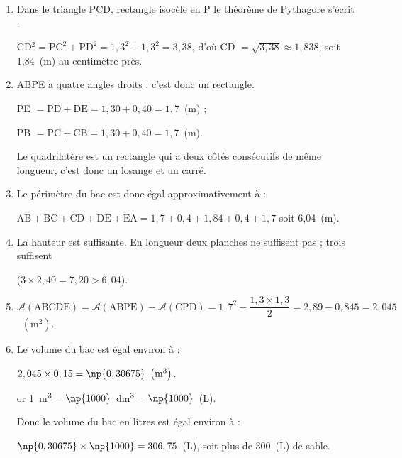 \begin{enumerate}
\item %
Dans le triangle PCD, rectangle isocèle en P le théorème de Pythagore s'écrit :

CD$^2 = \text{PC}^2 + \text{PD}^2 = 1,3^2 + 1,3^2 = 3,38$, d'où CD $= \sqrt{3,38} \approx 1,838$, soit 1,84~(m) au centimètre près.
\item %
ABPE a quatre angles droits : c'est donc un rectangle.

PE $ = \text{PD} + \text{DE} = 1,30 + 0,40 = 1,7$~(m) ;


PB $ = \text{PC} + \text{CB} = 1,30 + 0,40 = 1,7$~(m).

Le quadrilatère est un rectangle qui a deux côtés consécutifs de même longueur, c'est donc un losange et un carré. 
\item %
Le périmètre du bac est donc égal approximativement à :

$\text{AB} + \text{BC} + \text{CD} + \text{DE} + \text{EA} = 1,7 + 0,4 + 1,84 + 0,4 + 1,7$ soit 6,04~(m).
\item %
La hauteur est suffisante. En longueur deux planches ne suffisent pas  ; trois suffisent 

($3 \times 2,40 = 7,20 > 6,04$).
\item %
$\mathcal{A}(\text{ABCDE}) = \mathcal{A}(\text{ABPE}) - \mathcal{A}(\text{CPD}) = 1,7^2 - \dfrac{1,3 \times 1,3}{2} = 2,89 - 0,845 = 2,045$~$\left(\text{m}^2\right)$.
\item %
Le volume du bac est égal environ à :

$2,045 \times 0,15 = \np{0,30675}~\left(\text{m}^3\right)$.

or 1~m$^3 = \np{1000}$~dm$^3 = \np{1000}$~(L).

Donc le volume du bac en litres est égal environ à :

$\np{0,30675} \times \np{1000} = 306,75$~(L), soit plus de 300~(L) de sable.
\end{enumerate}


